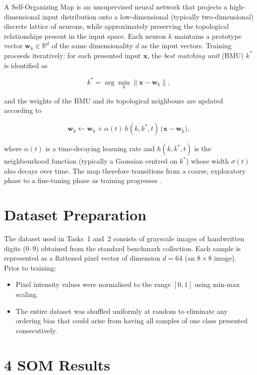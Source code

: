 \documentclass[12pt,a4paper]{report}
\begin{document}
A Self-Organizing Map is an unsupervised neural network that projects a high-dimensional
input distribution onto a low-dimensional (typically two-dimensional) discrete lattice of
neurons, while approximately preserving the topological relationships present in the input
space. Each neuron $k$ maintains a prototype vector $\mathbf{w}_k \in \mathbb{R}^d$ of
the same dimensionality $d$ as the input vectors. Training proceeds iteratively: for each
presented input $\mathbf{x}$, the \emph{best matching unit} (BMU) $k^*$ is identified as

\begin{equation}
  k^* = \arg\min_k \|\mathbf{x} - \mathbf{w}_k\|,
\end{equation}

and the weights of the BMU and its topological neighbours are updated according to

\begin{equation}
  \mathbf{w}_k \leftarrow \mathbf{w}_k + \alpha(t)\, h(k, k^*, t)\,
  \bigl(\mathbf{x} - \mathbf{w}_k\bigr),
\end{equation}

where $\alpha(t)$ is a time-decaying learning rate and $h(k, k^*, t)$ is the neighbourhood
function (typically a Gaussian centred on $k^*$) whose width $\sigma(t)$ also decays over
time. The map therefore transitions from a coarse, exploratory phase to a fine-tuning
phase as training progresses \cite{kohonen1990}.

\section{Dataset Preparation}

The dataset used in Tasks~1 and~2 consists of grayscale images of handwritten digits
(0–9) obtained from the standard benchmark collection. Each sample is represented as a
flattened pixel vector of dimension $d = 64$ (an $8 \times 8$ image). Prior to training:

\begin{itemize}
  \item Pixel intensity values were normalised to the range $[0, 1]$ using min-max scaling.
  \item The entire dataset was shuffled uniformly at random to eliminate any ordering bias
        that could arise from having all samples of one class presented consecutively.
\end{itemize}

\section{4 SOM Results}
\end{document}
